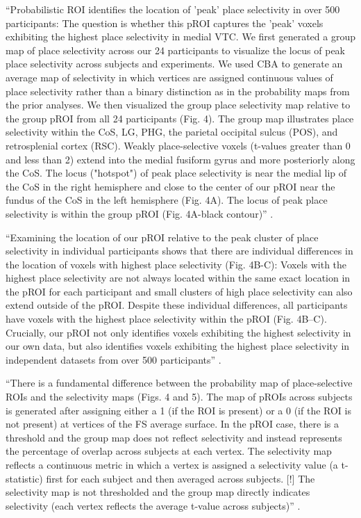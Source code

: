 ``Probabilistic ROI identifies the location of 'peak' place selectivity in over
500 participants:
%
The question is whether this pROI captures the 'peak' voxels exhibiting the
highest place selectivity in medial VTC.
%
We first generated a group map of place selectivity across our 24 participants
to visualize the locus of peak place selectivity across subjects and
experiments.
%
We used CBA to generate an average map of selectivity in which vertices are
assigned continuous values of place selectivity rather than a binary distinction
as in the probability maps from the prior analyses.
%
We then visualized the group place selectivity map relative to the group pROI
from all 24 participants (Fig. 4).
%
The group map illustrates place selectivity within the CoS, LG, PHG, the
parietal occipital sulcus (POS), and retrosplenial cortex (RSC).
%
Weakly place-selective voxels (t-values greater than 0 and less than 2) extend
into the medial fusiform gyrus and more posteriorly along the CoS.
%
The locus ("hotspot") of peak place selectivity is near the medial lip of the
CoS in the right hemisphere and close to the center of our pROI near the fundus
of the CoS in the left hemisphere (Fig. 4A).
%
The locus of peak place selectivity is within the group pROI (Fig. 4A-black
contour)'' \citep{weiner2018defining}.

``Examining the location of our pROI relative to the peak cluster of place
selectivity in individual participants shows that there are individual
differences in the location of voxels with highest place selectivity (Fig.
4B-C):
%
Voxels with the highest place selectivity are not always located within the same
exact location in the pROI for each participant and small clusters of high place
selectivity can also extend outside of the pROI.
%
Despite these individual differences, all participants have voxels with the
highest place selectivity within the pROI (Fig. 4B–C).
%
Crucially, our pROI not only identifies voxels exhibiting the highest
selectivity in our own data, but also identifies voxels exhibiting the highest
place selectivity in independent datasets from over 500 participants''
\citep{weiner2018defining}.

``There is a fundamental difference between the probability map of
place-selective ROIs and the selectivity maps (Figs. 4 and 5).
%
The map of pROIs across subjects is generated after assigning either a 1 (if the
ROI is present) or a 0 (if the ROI is not present) at vertices of the FS average
surface.
%
In the pROI case, there is a threshold and the group map does not reflect
selectivity and instead represents the percentage of overlap across subjects at
each vertex.
%
The selectivity map reflects a continuous metric in which a vertex is assigned a
selectivity value (a t-statistic) first for each subject and then averaged
across subjects.
%
[!] The selectivity map is not thresholded and the group map directly indicates
selectivity (each vertex reflects the average t-value across subjects)''
\citep{weiner2018defining}.




